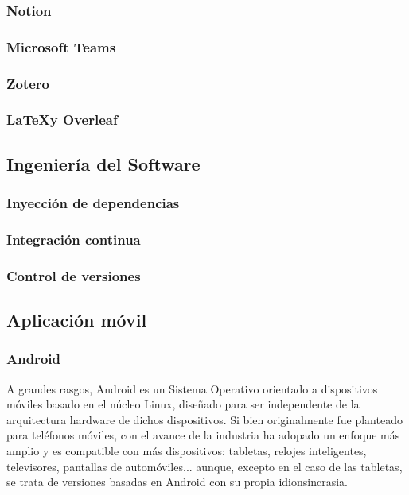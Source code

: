         \subsubsection{Notion}
        \subsubsection{Microsoft Teams}
        \subsubsection{Zotero}
        \subsubsection{\LaTeX y Overleaf}
        

    \subsection{Ingeniería del Software}
        \subsubsection{Inyección de dependencias}
        \subsubsection{Integración continua}
        \subsubsection{Control de versiones}

    \subsection{Aplicación móvil}

        \subsubsection{Android}

            A grandes rasgos, Android es un Sistema Operativo orientado a dispositivos móviles basado en el núcleo 
            Linux, diseñado para ser independente de la arquitectura hardware de dichos dispositivos. 
            Si bien originalmente fue planteado para teléfonos móviles, con el avance de la industria ha adopado 
            un enfoque más amplio y es compatible con más dispositivos: tabletas, relojes inteligentes, televisores, 
            pantallas de automóviles... aunque, excepto en el caso de las tabletas, se trata de versiones basadas en
            Android con su propia idionsincrasia. \newline

